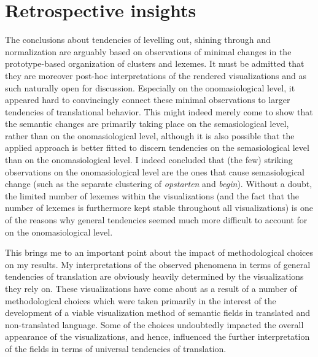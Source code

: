 \section{\label{sec:6.2}  Retrospective insights}

The conclusions about tendencies of levelling out, shining through and normalization are arguably based on observations of minimal changes in the prototype-based organization of clusters and lexemes. It must be admitted that they are moreover post-hoc interpretations of the rendered visualizations and as such naturally open for discussion. Especially on the onomasiological level, it appeared hard to convincingly connect these minimal observations to larger tendencies of translational behavior. This might indeed merely come to show that the semantic changes are primarily taking place on the semasiological level, rather than on the onomasiological level, although it is also possible that the applied approach is better fitted to discern tendencies on the semasiological level than on the onomasiological level. I indeed concluded that (the few) striking observations on the onomasiological level are the ones that cause semasiological change (such as the separate clustering of \textit{opstarten} and \textit{begin}). Without a doubt, the limited number of lexemes within the visualizations (and the fact that the number of lexemes is furthermore kept stable throughout all visualizations) is one of the reasons why general tendencies seemed much more difficult to account for on the onomasiological level.



This brings me to an important point about the impact of methodological choices on my results. My interpretations of the observed phenomena in terms of general tendencies of translation are obviously heavily determined by the visualizations they rely on. These visualizations have come about as a result of a number of methodological choices which were taken primarily in the interest of the development of a viable visualization method of semantic fields in translated and non-translated language. Some of the choices undoubtedly impacted the overall appearance of the visualizations, and hence, influenced the further interpretation of the fields in terms of universal tendencies of translation.



